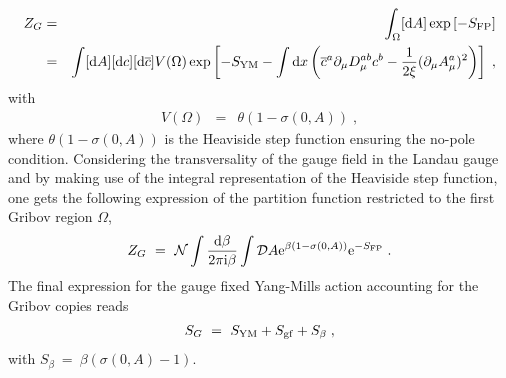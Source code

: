 \begin{eqnarray}\label{ZJ}
Z_{G} &=& \int_\Omega [\mathrm{d} A]   \exp \left[- S_{\mathrm{FP}}   \right] 
\nonumber\\
&=& \int [\mathrm{d} A][\mathrm{d} c] [\mathrm{d} \overline c]    V(\Omega)     \exp \left[- S_{\mathrm{YM}}  -   \int \mathrm{d} x \left(  \overline c^a   \partial_\mu  D_\mu^{ab}  c^b -  \frac{1}{2 \xi} (\partial_\mu A_\mu^a )^2  \right)  \right] \;,
\end{eqnarray}
with
\begin{eqnarray}
V(\Omega) &=& \theta (1 - \sigma(0,A))\;,
\label{nopolestepfunct}
\end{eqnarray}
where $\theta (1 - \sigma(0,A))$ is the Heaviside step function ensuring the no-pole
condition. Considering the transversality of the gauge field in the Landau gauge and by making
use of the integral representation of the Heaviside step function, one gets the following
expression of the partition function restricted to the first Gribov region $\Omega$,
\begin{equation}
Z_{G} ~=~  \mathcal N \int \frac{\mathrm{d} \beta}{2\pi \mathrm{i} \beta} \int {\cal D} A    \mathrm{e}^{\beta (1 -
\sigma(0,A))}    \mathrm{e}^{ - S_{\mathrm{FP}} }
\;.
\label{fullgenertfunct}
\end{equation}
The final expression for the gauge fixed Yang-Mills action accounting for the Gribov 
copies reads
\begin{eqnarray}
S_{G} ~=~ S_{\mathrm{YM}} + S_{\mathrm{gf}} +  S_{\beta}\;,
\label{fullgribovact}
\end{eqnarray}
with $S_{\beta} ~=~ \beta\left( \sigma(0,A) - 1\right)$.

